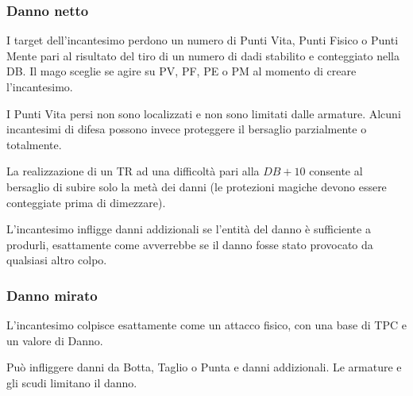 \subsubsection{Danno netto}

I target dell'incantesimo perdono un numero di Punti Vita, Punti
Fisico o Punti Mente pari al risultato del tiro di un numero di dadi
stabilito e conteggiato nella DB. Il mago sceglie se agire su PV, PF,
PE o PM al momento di creare l'incantesimo.

I Punti Vita persi non sono localizzati e non sono limitati dalle
armature. Alcuni incantesimi di difesa possono invece proteggere il
bersaglio parzialmente o totalmente.

La realizzazione di un TR ad una difficolt\`a pari alla $DB+10$
consente al bersaglio di subire solo la met\`a dei danni (le
protezioni magiche devono essere conteggiate prima di dimezzare).

L'incantesimo infligge danni addizionali se l'entit\`a del danno \`e
sufficiente a produrli, esattamente come avverrebbe se il danno
fosse stato provocato da qualsiasi altro colpo.





\subsubsection{Danno mirato}
L'incantesimo colpisce esattamente come un attacco fisico, con una base di TPC
e un valore di Danno. 

Pu\`o infliggere danni da Botta, Taglio o Punta e danni
addizionali. Le armature e gli scudi limitano il danno. 


